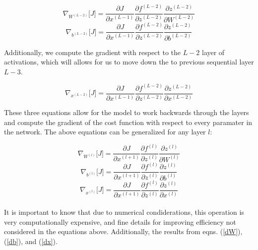 \documentclass[12pt,letterpaper]{article}
\begin{document}
\begin{equation}
\nabla_{W^{(L-2)}} \Big[ J \Big] = 
\frac{\partial J}{\partial x^{(L-1)}} \frac{\partial f^{(L-2)}}{\partial z^{(L-2)}} \frac{\partial z^{(L-2)}}{\partial W^{(L-2)}}
\end{equation}
\begin{equation}
\nabla_{b^{(L-2)}} \Big[ J \Big] = 
\frac{\partial J}{\partial x^{(L-1)}} \frac{\partial f^{(L-2)}}{\partial z^{(L-2)}} \frac{\partial z^{(L-2)}}{\partial b^{(L-2)}}
\end{equation}

Additionally, we compute the gradient with respect to the $L-2$ layer of activations, which will allows for us to move down the to previous sequential layer $L-3$.

\begin{equation}
\nabla_{x^{(L-2)}} \Big[ J \Big] = 
\frac{\partial J}{\partial x^{(L-1)}} \frac{\partial f^{(L-2)}}{\partial z^{(L-2)}} \frac{\partial z^{(L-2)}}{\partial x^{(L-2)}}
\end{equation} 

These three equations allow for the model to work backwards through the layers and compute the gradient of the cost function with respect to every paramater in the network. The above equations can be generalized for any layer $l$:

\begin{equation}
\label{dW}
\nabla_{W^{(l)}} \Big[ J \Big] = 
\frac{\partial J}{\partial x^{(l+1)}} \frac{\partial f^{(l)}}{\partial z^{(l)}} \frac{\partial z^{(l)}}{\partial W^{(l)}}
\end{equation}
\begin{equation}
\label{db}
\nabla_{b^{(l)}} \Big[ J \Big] = 
\frac{\partial J}{\partial x^{(l+1)}} \frac{\partial f^{(l)}}{\partial z^{(l)}} \frac{\partial z^{(l)}}{\partial b^{(l)}}
\end{equation}
\begin{equation}
\label{dx}
\nabla_{x^{(l)}} \Big[ J \Big] = 
\frac{\partial J}{\partial x^{(l+1)}} \frac{\partial f^{(l)}}{\partial z^{(l)}} \frac{\partial z^{(l)}}{\partial x^{(l)}}
\end{equation}

\paragraph*{}It is important to know that due to numerical condiderations, this operation is very computationally expensive, and fine details for improving efficiency not considered in the equations above. Additionally, the results from eqns. (\ref{dW}), (\ref{db}), and (\ref{dx}).
\end{document}
